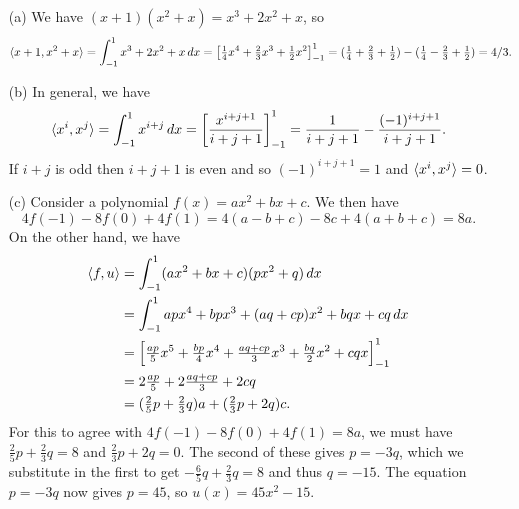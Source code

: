  \begin{itemize}
  \item[(a)] We have $(x+1)(x^2+x)=x^3+2x^2+x$, so
   \[ \langle x+1,x^2+x\rangle=\int_{-1}^1 x^3+2x^2+x\,dx =
       \left[ \tfrac{1}{4}x^4 + \tfrac{2}{3}x^3 +
        \tfrac{1}{2}x^2 \right]_{-1}^1 =
       (\tfrac{1}{4}+\tfrac{2}{3}+\tfrac{1}{2}) -
       (\tfrac{1}{4}-\tfrac{2}{3}+\tfrac{1}{2}) = 4/3.
   \]
  \item[(b)] In general, we have
   \[ \langle x^i,x^j\rangle = \int_{-1}^1 x^{i+j}\,dx =
       \left[ \frac{x^{i+j+1}}{i+j+1} \right]_{-1}^1 =
        \frac{1}{i+j+1} - \frac{(-1)^{i+j+1}}{i+j+1}.
   \]
   If $i+j$ is odd then $i+j+1$ is even and so $(-1)^{i+j+1}=1$ and
   $\langle x^i,x^j\rangle=0$.
  \item[(c)] Consider a polynomial $f(x)=ax^2+bx+c$.  We then have
   \[ 4f(-1)-8f(0)+4f(1) = 4 (a-b+c) -8c + 4(a+b+c) = 8a. \]
   On the other hand, we have
   \begin{align*}
    \langle f,u\rangle &= \int_{-1}^1 (ax^2+bx+c)(px^2+q)\,dx \\
     &= \int_{-1}^1 apx^4 + bpx^3+ (aq+cp)x^2 + bqx + cq \, dx \\
     &= \left[ \tfrac{ap}{5} x^5 + \tfrac{bp}{4} x^4 +
         \tfrac{aq+cp}{3} x^3 + \tfrac{bq}{2} x^2 + cqx \right]_{-1}^1 \\
     &= 2\tfrac{ap}{5} + 2\tfrac{aq+cp}{3} + 2cq \\
     &= (\tfrac{2}{5}p+\tfrac{2}{3}q)a +
        (\tfrac{2}{3}p+2q)c.
   \end{align*}
   For this to agree with $4f(-1)-8f(0)+4f(1)=8a$, we must have
   $\tfrac{2}{5}p+\tfrac{2}{3}q=8$ and $\tfrac{2}{3}p+2q=0$.  The
   second of these gives $p=-3q$, which we substitute in the first to
   get $-\tfrac{6}{5}q+\tfrac{2}{3}q=8$ and thus $q=-15$.  The
   equation $p=-3q$ now gives $p=45$, so $u(x)=45x^2-15$.
 \end{itemize}
\EndDeferredSolution

